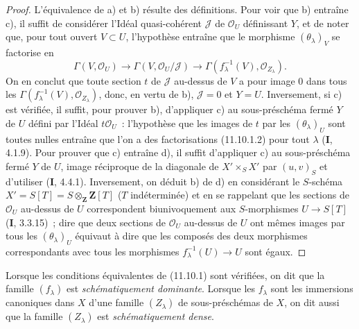 \begin{proof}
L'équivalence de a) et b) résulte des définitions. Pour voir que b) entraîne
c), il suffit de considérer l'Idéal quasi-cohérent $\mathcal J$ de
$\mathcal O_U$ définissant $Y$, et de noter que, pour tout ouvert $V\subset U$,
l'hypothèse entraîne que le morphisme $(\theta_\lambda)_V$ se factorise en
\[
\Gamma(V,\mathcal O_U)\longrightarrow
\Gamma(V,\mathcal O_U/\mathcal J)\longrightarrow
\Gamma(f_\lambda^{-1}(V),\mathcal O_{Z_\lambda}).
\]
On en conclut que toute section $t$ de $\mathcal J$ au-dessus de $V$ a pour
image 0 dans tous les $\Gamma(f_\lambda^{-1}(V),\mathcal O_{Z_\lambda})$,
donc, en vertu de b), $\mathcal J=0$ et $Y=U$. Inversement, si c) est vérifiée,
il suffit, pour prouver b), d'appliquer c) au sous-préschéma fermé $Y$ de $U$
défini par l'Idéal $t\mathcal O_U$~: l'hypothèse que les images de $t$ par les
$(\theta_\lambda)_U$ sont toutes nulles entraîne que l'on a des factorisations
(11.10.1.2) pour tout $\lambda$ ($\mathbf I$, 4.1.9). Pour prouver que c)
entraîne d), il suffit d'appliquer c) au sous-préschéma fermé $Y$ de $U$, image
réciproque de la diagonale de $X'\times_SX'$ par $(u,v)_S$ et d'utiliser
($\mathbf I$, 4.4.1). Inversement, on déduit b) de d) en considérant le
$S$-schéma $X'=S[T]=S\otimes_{\mathbf Z}\mathbf Z[T]$ ($T$ indéterminée) et en
se rappelant que les sections de $\mathcal O_U$ au-dessus de $U$ correspondent
biunivoquement aux $S$-morphismes $U\to S[T]$ ($\mathbf I$, 3.3.15)~; dire que
deux sections de $\mathcal O_U$ au-dessus de $U$ ont mêmes images par tous les
$(\theta_\lambda)_U$ équivaut à dire que les composés des deux morphismes
correspondants avec tous les morphismes $f_\lambda^{-1}(U)\to U$ sont égaux.
\end{proof}

\begin{definition}[11.10.2]
\label{IV.11.10.2-fr}
Lorsque les conditions équivalentes de (11.10.1) sont vérifiées, on dit que la
famille $(f_\lambda)$ est \emph{schématiquement dominante}. Lorsque les
$f_\lambda$ sont les immersions canoniques dans $X$ d'une famille
$(Z_\lambda)$ de sous-préschémas de $X$, on dit aussi que la famille
$(Z_\lambda)$ est \emph{schématiquement dense}.
\end{definition}

